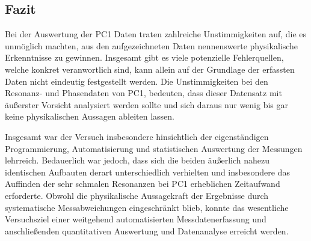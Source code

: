 \documentclass[11pt,a4paper]{article}
\begin{document}
\subsection{Fazit}
Bei der Auswertung der PC1 Daten traten zahlreiche Unstimmigkeiten auf, die es unmöglich machten,
aus den aufgezeichneten Daten nennenswerte physikalische Erkenntnisse zu gewinnen. Insgesamt gibt es
viele potenzielle Fehlerquellen, welche konkret veranwortlich sind, kann  allein auf der Grundlage der erfassten Daten nicht eindeutig festgestellt werden. Die Unstimmigkeiten bei den Resonanz- und Phasendaten von PC1, bedeuten, dass dieser Datensatz mit äußerster Vorsicht analysiert werden sollte und sich daraus nur wenig bis gar keine physikalischen
Aussagen ableiten lassen. 

Insgesamt war der Versuch insbesondere hinsichtlich der eigenständigen Programmierung, Automatisierung und statistischen Auswertung der Messungen lehrreich. Bedauerlich war jedoch, dass sich die beiden äußerlich nahezu identischen Aufbauten derart unterschiedlich verhielten und insbesondere das Auffinden der sehr schmalen Resonanzen bei PC1 erheblichen Zeitaufwand erforderte. Obwohl die physikalische Aussagekraft der Ergebnisse durch systematische Messabweichungen eingeschränkt blieb, konnte das wesentliche Versuchsziel einer weitgehend automatisierten Messdatenerfassung und anschließenden quantitativen Auswertung und Datenanalyse erreicht werden.


\printbibliography[heading=bibintoc,title={Literaturverzeichnis}]
\end{document}
